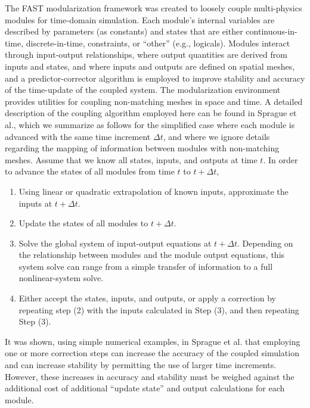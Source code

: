 \documentclass{aiaa-tc}
\begin{document}
The FAST modularization framework\cite{Jonkman:2013,Sprague:2014,Sprague:FAST2015} was created to loosely couple multi-physics modules for time-domain simulation.  
Each module's internal variables are described by parameters (as constants) and states that are either continuous-in-time, discrete-in-time, constraints, or ``other'' (e.g., logicals).  
Modules interact through input-output relationships, where output quantities are derived from inputs and states, and where inputs and outputs are defined on spatial meshes, and a predictor-corrector algorithm is employed to improve stability and accuracy of the time-update of the coupled system.    
The modularization environment provides utilities for coupling non-matching meshes in space and time.
A detailed description of the coupling algorithm employed here can be found in Sprague et al.\cite{Sprague:FAST2015}, which we summarize as follows for the simplified case where each module is advanced with the same time increment $\Delta t$, and where we ignore details regarding the mapping of information between modules with non-matching meshes.   
Assume that we know all states, inputs, and outputs at time $t$.  In order to advance the states of all modules from time $t$ to $t+ \Delta t$, 
\begin{enumerate}

\item Using linear or quadratic extrapolation of known inputs, approximate the inputs at $t+\Delta t$.  

\item Update the states of all modules to $t + \Delta t$.  

\item Solve the global system of input-output equations at $t + \Delta t$.  Depending on the relationship between modules and the module output equations, this system solve can range from a simple transfer of information to a full nonlinear-system solve. 

\item Either accept the states, inputs, and outputs, or apply a correction by repeating step (2) with the inputs calculated in Step (3), and then repeating Step (3).

\end{enumerate}
It was shown, using simple numerical examples, in Sprague et al.\cite{Sprague:2014,Sprague:FAST2015} that employing one or more correction steps can increase the accuracy of the coupled simulation and can increase stability by permitting the use of larger time increments.  However, these increases in accuracy and stability must be weighed against the additional cost of additional ``update state'' and output calculations for each module.
\end{document}
